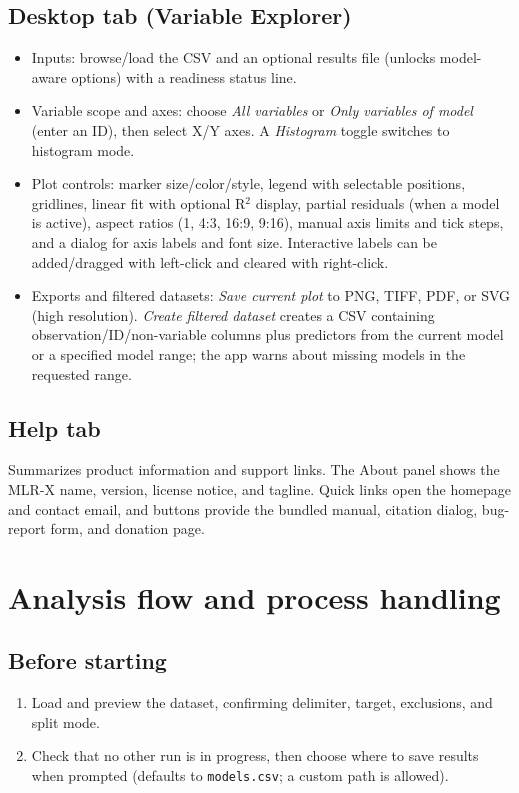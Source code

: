\documentclass[11pt,a4paper]{article}
\begin{document}
\subsection{\textbf{Desktop} tab (Variable Explorer)}
\begin{itemize}
  \item Inputs: browse/load the CSV and an optional results file (unlocks model-aware options) with a readiness status line.
  \item Variable scope and axes: choose \emph{All variables} or \emph{Only variables of model} (enter an ID), then select X/Y axes. A \emph{Histogram} toggle switches to histogram mode.
  \item Plot controls: marker size/color/style, legend with selectable positions, gridlines, linear fit with optional R$^2$ display, partial residuals (when a model is active), aspect ratios (1, 4:3, 16:9, 9:16), manual axis limits and tick steps, and a dialog for axis labels and font size. Interactive labels can be added/dragged with left-click and cleared with right-click.
  \item Exports and filtered datasets: \emph{Save current plot} to PNG, TIFF, PDF, or SVG (high resolution). \emph{Create filtered dataset} creates a CSV containing observation/ID/non-variable columns plus predictors from the current model or a specified model range; the app warns about missing models in the requested range.
\end{itemize}

\subsection{\textbf{Help} tab}
Summarizes product information and support links. The About panel shows the MLR-X name, version, license notice, and tagline. Quick links open the homepage and contact email, and buttons provide the bundled manual, citation dialog, bug-report form, and donation page.

\section{Analysis flow and process handling}
\subsection{Before starting}
\begin{enumerate}
  \item Load and preview the dataset, confirming delimiter, target, exclusions, and split mode.
  \item Check that no other run is in progress, then choose where to save results when prompted (defaults to \texttt{models.csv}; a custom path is allowed).
\end{enumerate}
\end{document}

